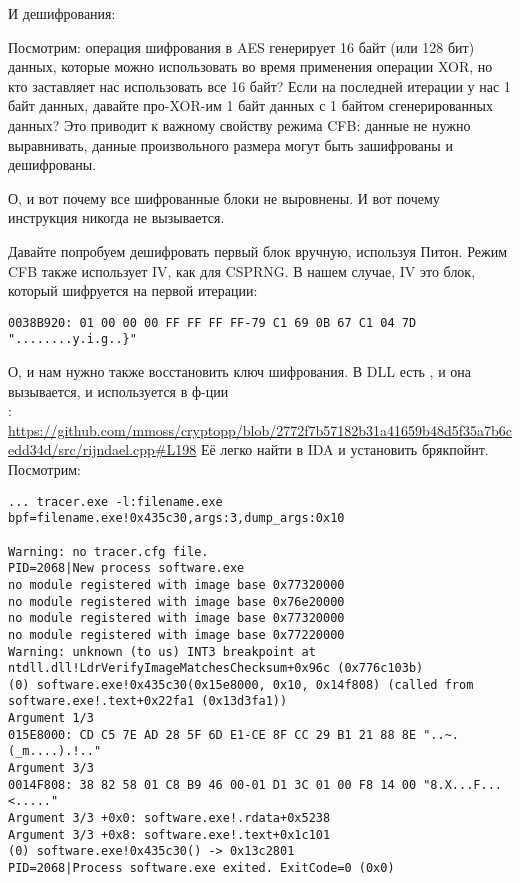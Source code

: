 \begin{figure}[H]
\centering
{}
\end{figure}

И дешифрования:

\begin{figure}[H]
\centering
{}
\label{fig:CFB_decryption}
\end{figure}

Посмотрим: операция шифрования в AES генерирует 16 байт (или 128 бит)  данных,
которые можно использовать во время применения операции XOR, но кто заставляет нас использовать все 16 байт?
Если на последней итерации у нас 1 байт данных, давайте про-XOR-им 1 байт данных с 1 байтом сгенерированных
 данных?
Это приводит к важному свойству режима \ac{CFB}: данные не нужно выравнивать, данные произвольного размера
могут быть зашифрованы и дешифрованы.

О, и вот почему все шифрованные блоки не выровнены.
И вот почему инструкция  никогда не вызывается.

Давайте попробуем дешифровать первый блок вручную, используя Питон.
Режим \ac{CFB} также использует \ac{IV}, как  для \ac{CSPRNG}.
В нашем случае, \ac{IV} это блок, который шифруется на первой итерации:

\begin{lstlisting}
0038B920: 01 00 00 00 FF FF FF FF-79 C1 69 0B 67 C1 04 7D "........y.i.g..}"
\end{lstlisting}

О, и нам нужно также восстановить ключ шифрования.
В DLL есть , и она вызывается, и используется в ф-ции \\
:\\
\url{https://github.com/mmoss/cryptopp/blob/2772f7b57182b31a41659b48d5f35a7b6cedd34d/src/rijndael.cpp#L198}
Её легко найти в IDA и установить брякпойнт. Посмотрим:

\begin{lstlisting}
... tracer.exe -l:filename.exe bpf=filename.exe!0x435c30,args:3,dump_args:0x10

Warning: no tracer.cfg file.
PID=2068|New process software.exe
no module registered with image base 0x77320000
no module registered with image base 0x76e20000
no module registered with image base 0x77320000
no module registered with image base 0x77220000
Warning: unknown (to us) INT3 breakpoint at ntdll.dll!LdrVerifyImageMatchesChecksum+0x96c (0x776c103b)
(0) software.exe!0x435c30(0x15e8000, 0x10, 0x14f808) (called from software.exe!.text+0x22fa1 (0x13d3fa1))
Argument 1/3
015E8000: CD C5 7E AD 28 5F 6D E1-CE 8F CC 29 B1 21 88 8E "..~.(_m....).!.."
Argument 3/3
0014F808: 38 82 58 01 C8 B9 46 00-01 D1 3C 01 00 F8 14 00 "8.X...F...<....."
Argument 3/3 +0x0: software.exe!.rdata+0x5238
Argument 3/3 +0x8: software.exe!.text+0x1c101
(0) software.exe!0x435c30() -> 0x13c2801
PID=2068|Process software.exe exited. ExitCode=0 (0x0)
\end{lstlisting}

